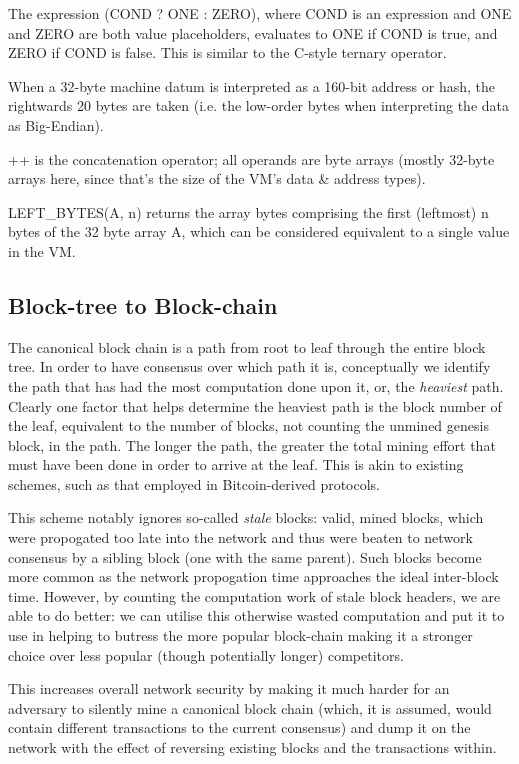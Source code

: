 \documentclass[9pt,oneside]{amsart}
\begin{document}
\begin{multicols}{2}
The expression (COND ? ONE : ZERO), where COND is an expression and ONE and ZERO are both value placeholders, evaluates to ONE if COND is true, and ZERO if COND is false. This is similar to the C-style ternary operator.

When a 32-byte machine datum is interpreted as a 160-bit address or hash, the rightwards 20 bytes are taken (i.e. the low-order bytes when interpreting the data as Big-Endian).

++ is the concatenation operator; all operands are byte arrays (mostly 32-byte arrays here, since that's the size of the VM's data \& address types).

LEFT\_BYTES(A, n) returns the array bytes comprising the first (leftmost) n bytes of the 32 byte array A, which can be considered equivalent to a single value in the VM.



\subsection{Block-tree to Block-chain} \label{ch:ghost}

The canonical block chain is a path from root to leaf through the entire block tree. In order to have consensus over which path it is, conceptually we identify the path that has had the most computation done upon it, or, the \textit{heaviest} path. Clearly one factor that helps determine the heaviest path is the block number of the leaf, equivalent to the number of blocks, not counting the unmined genesis block, in the path. The longer the path, the greater the total mining effort that must have been done in order to arrive at the leaf. This is akin to existing schemes, such as that employed in Bitcoin-derived protocols.

This scheme notably ignores so-called \textit{stale} blocks: valid, mined blocks, which were propogated too late into the network and thus were beaten to network consensus by a sibling block (one with the same parent). Such blocks become more common as the network propogation time approaches the ideal inter-block time. However, by counting the computation work of stale block headers, we are able to do better: we can utilise this otherwise wasted computation and put it to use in helping to butress the more popular block-chain making it a stronger choice over less popular (though potentially longer) competitors.

This increases overall network security by making it much harder for an adversary to silently mine a canonical block chain (which, it is assumed, would contain different transactions to the current consensus) and dump it on the network with the effect of reversing existing blocks and the transactions within.


\end{multicols}
\end{document}
